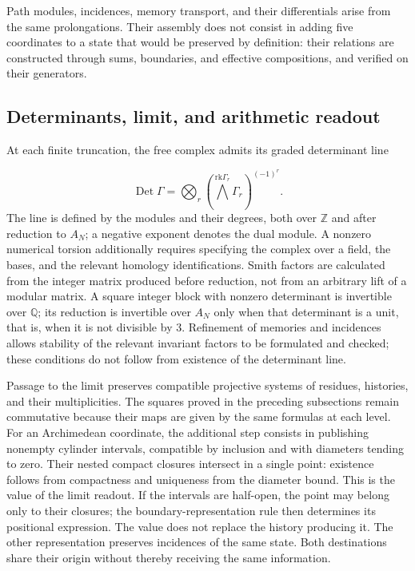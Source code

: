 Path modules, incidences, memory transport, and their differentials arise from the same prolongations. Their assembly does not consist in adding five coordinates to a state that would be preserved by definition: their relations are constructed through sums, boundaries, and effective compositions, and verified on their generators.

\subsection{Determinants, limit, and arithmetic readout}
At each finite truncation, the free complex admits its graded determinant line

\[
\operatorname{Det}\Gamma=
\bigotimes_r\left(\bigwedge^{\mathrm{rk}\Gamma_r}\Gamma_r\right)^{(-1)^r}.
\]
The line is defined by the modules and their degrees, both over \(\mathbb Z\) and after reduction to \(A_N\); a negative exponent denotes the dual module. A nonzero numerical torsion additionally requires specifying the complex over a field, the bases, and the relevant homology identifications. Smith factors are calculated from the integer matrix produced before reduction, not from an arbitrary lift of a modular matrix. A square integer block with nonzero determinant is invertible over \(\mathbb Q\); its reduction is invertible over \(A_N\) only when that determinant is a unit, that is, when it is not divisible by \(3\). Refinement of memories and incidences allows stability of the relevant invariant factors to be formulated and checked; these conditions do not follow from existence of the determinant line.

Passage to the limit preserves compatible projective systems of residues, histories, and their multiplicities. The squares proved in the preceding subsections remain commutative because their maps are given by the same formulas at each level. For an Archimedean coordinate, the additional step consists in publishing nonempty cylinder intervals, compatible by inclusion and with diameters tending to zero. Their nested compact closures intersect in a single point: existence follows from compactness and uniqueness from the diameter bound. This is the value of the limit readout. If the intervals are half-open, the point may belong only to their closures; the boundary-representation rule then determines its positional expression. The value does not replace the history producing it. The other representation preserves incidences of the same state. Both destinations share their origin without thereby receiving the same information.

